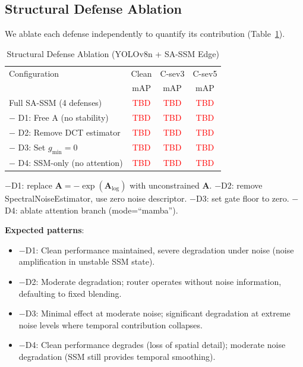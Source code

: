 \documentclass[conference]{IEEEtran}
\newcommand{\tbd}[1]{\textcolor{red}{#1}}
\begin{document}
\subsection{Structural Defense Ablation}
\label{sec:ablation}

We ablate each defense independently to quantify its contribution (Table~\ref{tab:ablation}).

\begin{table}[t]
\centering
\caption{Structural Defense Ablation (YOLOv8n + SA-SSM Edge)}
\label{tab:ablation}
\small
\begin{tabular}{@{}lccc@{}}
\toprule
Configuration & Clean & C-sev3 & C-sev5 \\
& mAP & mAP & mAP \\
\midrule
Full SA-SSM (4 defenses) & \tbd{TBD} & \tbd{TBD} & \tbd{TBD} \\
\midrule
$-$ D1: Free A (no stability) & \tbd{TBD} & \tbd{TBD} & \tbd{TBD} \\
$-$ D2: Remove DCT estimator & \tbd{TBD} & \tbd{TBD} & \tbd{TBD} \\
$-$ D3: Set $g_{\min}=0$ & \tbd{TBD} & \tbd{TBD} & \tbd{TBD} \\
$-$ D4: SSM-only (no attention) & \tbd{TBD} & \tbd{TBD} & \tbd{TBD} \\
\bottomrule
\end{tabular}
\vspace{0.5em}

{\footnotesize $-$D1: replace $\mathbf{A}=-\exp(\mathbf{A}_{\log})$ with unconstrained $\mathbf{A}$. $-$D2: remove SpectralNoiseEstimator, use zero noise descriptor. $-$D3: set gate floor to zero. $-$D4: ablate attention branch (mode=``mamba'').}
\end{table}

\textbf{Expected patterns}:
\begin{itemize}
\item $-$D1: Clean performance maintained, severe degradation under noise (noise amplification in unstable SSM state).
\item $-$D2: Moderate degradation; router operates without noise information, defaulting to fixed blending.
\item $-$D3: Minimal effect at moderate noise; significant degradation at extreme noise levels where temporal contribution collapses.
\item $-$D4: Clean performance degrades (loss of spatial detail); moderate noise degradation (SSM still provides temporal smoothing).
\end{itemize}
\end{document}

